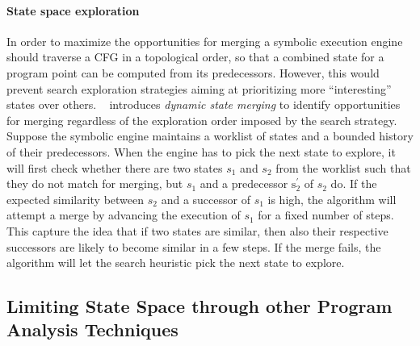 \paragraph{State space exploration} In order to maximize the opportunities for merging a symbolic execution engine should traverse a CFG in a topological order, so that a combined state for a program point can be computed from its predecessors. However, this would prevent search exploration strategies aiming at prioritizing more ``interesting'' states over others. ~\cite{KKB-PLDI12} introduces {\em dynamic state merging} to identify opportunities for merging regardless of the exploration order imposed by the search strategy.
Suppose the symbolic engine maintains a worklist of states and a bounded history of their predecessors. When the engine has to pick the next state to explore, it will first check whether there are two states $s_1$ and $s_2$ from the worklist such that they do not match for merging, but $s_1$ and a predecessor $\text{s}^{\prime}_2$ of $s_2$ do. If the expected similarity between $s_2$ and a successor of $s_1$ is high, the algorithm will attempt a merge by advancing the execution of $s_1$ for a fixed number of steps. This capture the idea that if two states are similar, then also their respective successors are likely to become similar in a few steps. If the merge fails, the algorithm will let the search heuristic pick the next state to explore.


\subsection{Limiting State Space through other Program Analysis Techniques}

